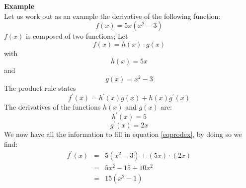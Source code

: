 \documentclass[a4paper]{report}
\begin{document}
\begin{mdframed}[backgroundcolor=exampcol]
\textbf{Example}\\
Let us work out as an example the derivative of the following function: 
\begin{equation}
f(x)=5x(x^2-3)
\end{equation}
$f(x)$ is composed of two functions; Let
\begin{equation}
f(x) = h(x)\cdot g(x)
\end{equation}
with
\begin{equation}
h(x)=5x
\end{equation}
and 
\begin{equation}
g(x)=x^2-3
\end{equation}
The product rule states
\begin{equation}
f^\prime(x)=h^\prime(x)g(x)+h(x)g^\prime(x)
\label{eqprodex}
\end{equation}
The derivatives of the functions $h(x)$ and $g(x)$ are:
\begin{equation}
h^\prime(x)=5
\end{equation}
\begin{equation}
g^\prime(x)=2x
\end{equation}
We now have all the information to fill in equation \ref{eqprodex}, by doing so we find:
\begin{equation}
\begin{aligned}
f^\prime(x)&=&5(x^2-3)+(5x)\cdot (2x)\\
&=&5x^2-15+10x^2\\
&=&15(x^2-1)
\end{aligned}
\end{equation}
\end{mdframed}

\end{document}

